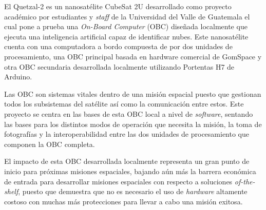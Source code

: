 El Quetzal-2 es un nanosatélite CubeSat 2U desarrollado como proyecto académico por estudiantes y \textit{staff} de la Universidad del Valle de Guatemala el cual pone a prueba una \textit{On-Board Computer} (OBC) diseñada localmente que ejecuta una inteligencia artificial capaz de identificar nubes. Este nanosatélite cuenta con una computadora a bordo compuesta de por dos unidades de procesamiento, una OBC principal basada en hardware comercial de GomSpace y otra OBC secundaria desarrollada localmente utilizando Portentas H7 de Arduino.

Las OBC son sistemas vitales dentro de una misión espacial puesto que gestionan todos los subsistemas del satélite así como la comunicación entre estos. Este proyecto se centra en las bases de esta OBC local a nivel de \textit{software}, sentando las bases para los distintos modos de operación que necesita la misión, la toma de fotografías y la interoperabilidad entre las dos unidades de procesamiento que componen la OBC completa.

El impacto de esta OBC desarrollada localmente representa un gran punto de inicio para próximas misiones espaciales, bajando aún más la barrera económica de entrada para desarrollar misiones espaciales con respecto a soluciones \textit{of-the-shelf}, puesto que demuestra que no es necesario el uso de \textit{hardware} altamente costoso con muchas más protecciones para llevar a cabo una misión exitosa.
